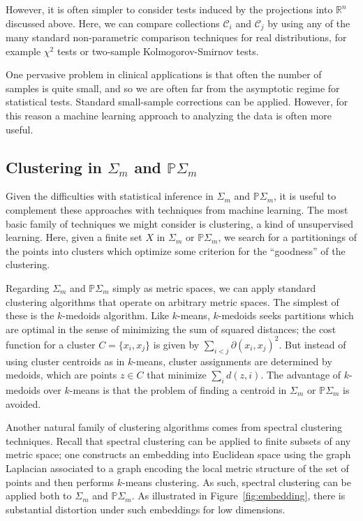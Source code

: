 \documentclass[a4paper,11pt]{article}
\newcommand{\aC}{\mathcal{C}}
\begin{document}
However, it is often simpler to consider tests induced by the projections into $\mathbb{R}^n$ discussed above.
Here, we can compare collections $\aC_i$ and $\aC_j$ by using any of the many standard non-parametric comparison techniques for real distributions, for example $\chi^2$ tests or two-sample Kolmogorov-Smirnov tests.

One pervasive problem in clinical applications is that often the number of samples is quite small, and so we are often far from the asymptotic regime for statistical tests.
Standard small-sample corrections can be applied.
However, for this reason a machine learning approach to analyzing the data is often more useful.

\subsection{Clustering in $\Sigma_m$ and $\mathbb{P}\Sigma_m$}

Given the difficulties with statistical inference in $\Sigma_m$ and $\mathbb{P}\Sigma_m$, it is useful to complement these approaches with techniques from machine learning.
The most basic family of techniques we might consider is clustering, a kind of unsupervised learning.
Here, given a finite set $X$ in $\Sigma_m$ or $\mathbb{P}\Sigma_m$, we search for a partitionings of the points into clusters which optimize some criterion for the ``goodness'' of the clustering.

Regarding $\Sigma_m$ and $\mathbb{P}\Sigma_m$ simply as metric spaces, we can apply standard clustering algorithms that operate on arbitrary metric spaces.
The simplest of these is the $k$-medoids algorithm.
Like $k$-means, $k$-medoids seeks partitions which are optimal in the sense of minimizing the sum of squared distances; the cost function for a cluster $C = \{x_i, x_j\}$ is given by $\sum_{i < j} \partial(x_i,x_j)^2$.
But instead of using cluster centroids as in $k$-means, cluster assignments are determined by medoids, which are points $z \in C$ that minimize $\sum_i d(z,i)$.
The advantage of $k$-medoids over $k$-means is that the problem of finding a centroid in $\Sigma_m$ or $\mathbb{P}\Sigma_m$ is avoided.

Another natural family of clustering algorithms comes from spectral clustering techniques.
Recall that spectral clustering can be applied to finite subsets of any metric space; one constructs an embedding into Euclidean space using the graph Laplacian associated to a graph encoding the local metric structure of the set of points and then performs $k$-means clustering.
As such, spectral clustering can be applied both to $\Sigma_m$ and $\mathbb{P}\Sigma_m$.
As illustrated in Figure~\ref{fig:embedding}, there is substantial distortion under such embeddings for low dimensions.
\end{document}
